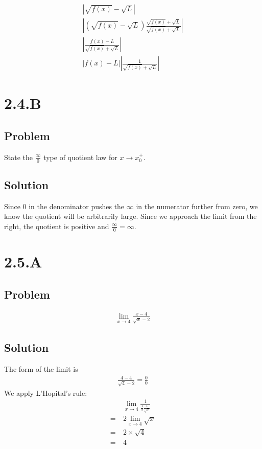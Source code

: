 \documentclass[12pt]{article}
\newcommand{\round}[1]{\left(       #1 \right)      }
\newcommand{\abs}  [1]{\left|       #1 \right|      }
\begin{document}
\begin{align*}
    \abs{\sqrt{f(x)} - \sqrt{L}} \\
    \abs{\round{\sqrt{f(x)} - \sqrt{L}} \frac{\sqrt{f(x)} + \sqrt{L}}{\sqrt{f(x)} + \sqrt{L}}} \\
    \abs{\frac{f(x) - L}{\sqrt{f(x)} + \sqrt{L}}} \\
    \abs{f(x) - L} \abs{\frac{1}{\sqrt{f(x)} + \sqrt{L}}}
\end{align*}



\section*{2.4.B}

\subsection*{Problem}
State the $\frac{\infty}{0}$ type of quotient law for $x \to x_0^+$.

\subsection*{Solution}

Since 0 in the denominator pushes the $\infty$ in the numerator further from zero, we know the quotient will be arbitrarily large. Since we approach the limit from the right, the quotient is positive and $\frac{\infty}{0} = \infty$.



\section*{2.5.A}

\subsection*{Problem}
\begin{align*}
    \lim_{x \to 4} \frac{x-4}{\sqrt{x} - 2}
\end{align*}

\subsection*{Solution}
The form of the limit is
\begin{align*}
    \frac{4 - 4}{\sqrt{4} - 2} = \frac{0}{0}
\end{align*}
We apply L'Hopital's rule:
\begin{align*}
       &   \lim_{x \to 4} \frac{1}{\frac{1}{2} \frac{1}{\sqrt{x}}} \\
    =\ & 2 \lim_{x \to 4} \sqrt{x} \\
    =\ & 2 \times \sqrt{4} \\
    =\ & 4
\end{align*}
\end{document}
